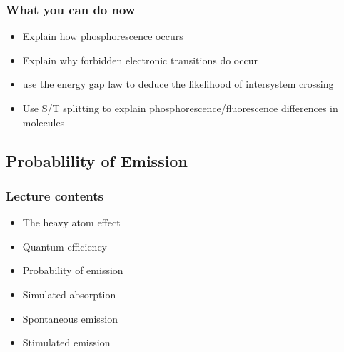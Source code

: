 \documentclass[a4paper,12pt,titlepage]{article}
\begin{document}
\begin{frame}
\frametitle{What you can do now}
\begin{itemize}
\item Explain how phosphorescence occurs
\item Explain why forbidden electronic transitions do occur
\item use the energy gap law to deduce the likelihood of intersystem crossing
\item Use S/T splitting to explain phosphorescence/fluorescence differences in molecules
\end{itemize}
\end{frame}

\subsection{Probablility of Emission}

\begin{frame}
	\frametitle{Lecture contents}
		\begin{itemize}
			\item The heavy atom effect
			\item Quantum efficiency
			\item Probability of emission
			\item Simulated absorption
			\item Spontaneous emission
			\item Stimulated emission
		\end{itemize}
	\end{frame}
\end{document}
